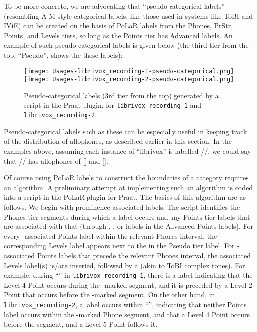 \begin{infobox}[frametitle=\textbf{Generating “Pseudo-Categorical” Labels from PoLaR Labels}]
	To be more concrete, we are advocating that “pseudo-categorical labels” (resembling A-M style categorical labels, like those used in systems like ToBI and IViE) can be created on the basis of PoLaR labels from the Phones, PrStr, Points, and Levels tiers, so long as the Points tier has Advanced labels. An example of such pseudo-categorical labels is given below (the third tier from the top, “Pseudo”, shows the these labels):
	
	\begin{minipage}{\linewidth}
	\begin{figure}[H]
	\centering
	\texttt{[image: Usages-librivox\_recording-1-pseudo-categorical.png]} \texttt{[image: Usages-librivox\_recording-2-pseudo-categorical.png]}
	\caption{Pseudo-categorical labels (3rd tier from the top) generated by a script in the Praat plugin, for \texttt{librivox\_recording-1} and \texttt{librivox\_recording-2}.%
	\label{fig:Usages-librivox recording pseudo categorical}%
	}
	\end{figure}
	\end{minipage}

	Pseudo-categorical labels such as these can be especially useful in keeping track of the distribution of allophones, as described earlier in this section. In the examples above, assuming each instance of “librivox” is labelled //, we could say that // has allophones of [] and [].
	
	Of course using PoLaR labels to construct the boundaries of a category requires an algorithm. A preliminary attempt at implementing such an algorithm is coded into a script in the PoLaR plugin for Praat. The basics of this algorithm are as follows. We begin with prominence-associated labels. The script identifies the Phones-tier segments during which a \textlabel{*} label occurs and any Points tier labels that are associated with that \textlabel{*} (through \textlabel{<}, \textlabel{>}, or  labels in the Advanced Points labels). For every \textlabel{*}-associated Points label within the relevant Phones interval, the corresponding Levels label appears next to the \textlabel{*} in the Pseudo tier label. For \textlabel{*}-associated Points labels that precede the relevant Phones interval, the associated Levels label(s) is/are inserted, followed by a \textlabel{+} (akin to ToBI complex tones). For example, during “” in \texttt{librivox\_recording-1}, there is a  label indicating that the Level 4 Point occurs during the \textlabel{*}-marked segment, and it is preceded by a Level 2 Point that occurs before the \textlabel{*}-marked segment. On the other hand, in \texttt{librivox\_recording-2}, a  label occurs within “”, indicating that neither Points label occurs within the \textlabel{*}-marked Phone segment, and that a Level 4 Point occurs before the segment, and a Level 5 Point follows it. 


\end{infobox}
